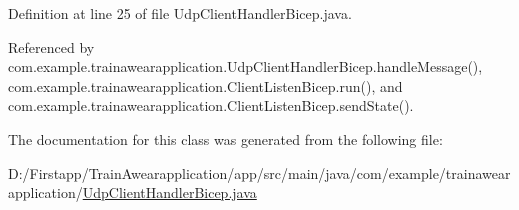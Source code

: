 Definition at line 25 of file Udp\+Client\+Handler\+Bicep.\+java.



Referenced by com.\+example.\+trainawearapplication.\+Udp\+Client\+Handler\+Bicep.\+handle\+Message(), com.\+example.\+trainawearapplication.\+Client\+Listen\+Bicep.\+run(), and com.\+example.\+trainawearapplication.\+Client\+Listen\+Bicep.\+send\+State().



The documentation for this class was generated from the following file\+:\begin{DoxyCompactItemize}
\item 
D\+:/\+Firstapp/\+Train\+Awearapplication/app/src/main/java/com/example/trainawearapplication/\mbox{\hyperlink{_udp_client_handler_bicep_8java}{Udp\+Client\+Handler\+Bicep.\+java}}\end{DoxyCompactItemize}
